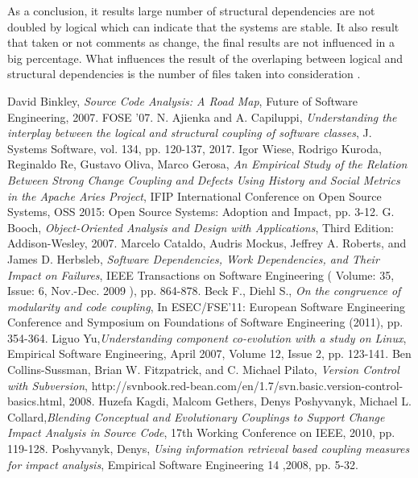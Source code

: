 \documentclass[conference,compsoc]{IEEEtran}
\begin{document}
As a conclusion, it results large number of structural dependencies are not doubled by logical which can indicate that the systems are stable. It also result that taken or not comments as change, the final results are not influenced in a big percentage. What influences the result of the overlaping between logical and structural dependencies is the number of files taken into consideration .

\begin{thebibliography}{1}

David Binkley, \emph{Source Code Analysis: A Road Map}, Future of Software Engineering, 2007. FOSE '07.
N. Ajienka and A. Capiluppi, \emph{Understanding the interplay between the logical and structural coupling of software classes}, J. Systems Software, vol. 134, pp. 120-137, 2017.
Igor Wiese, Rodrigo Kuroda, Reginaldo Re, Gustavo Oliva, Marco Gerosa, \emph{An Empirical Study of the Relation Between Strong Change Coupling and Defects Using History and Social Metrics in the Apache Aries Project}, IFIP International Conference on Open Source Systems, OSS 2015: Open Source Systems: Adoption and Impact, pp. 3-12.
G. Booch, \emph{Object-Oriented Analysis and Design with Applications}, Third Edition: Addison-Wesley, 2007.
Marcelo Cataldo, Audris Mockus, Jeffrey A. Roberts, and James D. Herbsleb, \emph{Software Dependencies, Work Dependencies, and Their Impact on Failures},  IEEE Transactions on Software Engineering ( Volume: 35, Issue: 6, Nov.-Dec. 2009 ), pp. 864-878.
Beck F., Diehl S.,\emph{ On the congruence of modularity and code coupling}, In ESEC/FSE'11: European Software Engineering Conference and Symposium on Foundations of Software Engineering (2011), pp. 354-364.
Liguo Yu,\emph{Understanding component co-evolution with a study on Linux}, Empirical Software Engineering, April 2007, Volume 12, Issue 2, pp. 123-141.
 Ben Collins-Sussman, Brian W. Fitzpatrick, and C. Michael Pilato, \emph{Version Control with Subversion}, http://svnbook.red-bean.com/en/1.7/svn.basic.version-control-basics.html, 2008.
 Huzefa Kagdi, Malcom Gethers, Denys Poshyvanyk, Michael L. Collard,\emph{Blending Conceptual and Evolutionary Couplings to Support Change Impact Analysis in Source Code}, 17th Working Conference on IEEE, 2010, pp. 119-128.
Poshyvanyk, Denys, \emph{Using information retrieval based coupling measures for impact analysis}, Empirical Software Engineering 14 ,2008, pp. 5-32.

\end{thebibliography}
\end{document}

